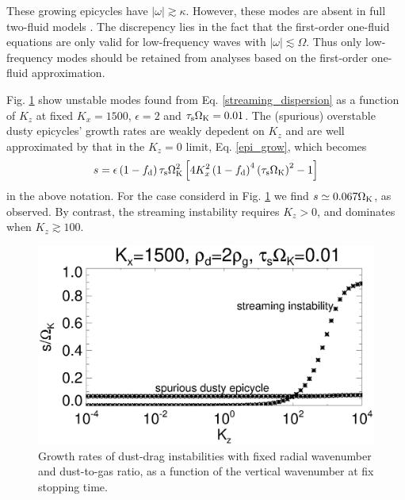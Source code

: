 These growing epicycles have $|\omega|\gtrsim \kappa$. 
However, these modes are absent in full two-fluid
models \citep{youdin05a}. The discrepency lies in the fact that the
first-order  one-fluid equations are only valid for low-frequency waves with
$|\omega|\lesssim \Omega$. Thus only 
low-frequency modes should be retained from analyses based on the
first-order one-fluid approximation. 


Fig. \ref{dusty_growth1} show unstable modes found from
Eq. \ref{streaming_dispersion} as a function of $K_z$ at fixed $K_x 
= 1500$, $\epsilon=2$ and $\tau_\mathrm{s}\Omega_{\rm K}=0.01$.  
The (spurious) overstable dusty epicycles' growth
rates are weakly depedent on $K_z$ and are well approximated by
that in the $K_z=0$ limit, Eq. \ref{epi_grow}, which becomes 
\begin{align*} 
  s = \epsilon \left(1 - f_\mathrm{d}
  \right)\tau_\mathrm{s}\Omega_{\rm K}^2\left[4K_x^2\left(1-f_\mathrm{d}\right)^4\left(\tau_\mathrm{s}\Omega_{\rm K}\right)^2
  -1 \right]
\end{align*}
in the above notation. 
For the case considerd in Fig. \ref{dusty_growth1} we find
$s\simeq0.067\Omega_{\rm K}$, as observed. By contrast, the streaming
instability requires $K_z>0$, and dominates when
$K_z\gtrsim 100$. 

\begin{figure}
  \includegraphics[width=\linewidth]{figures/streaming2}
  \caption{Growth rates of dust-drag instabilities with fixed radial
    wavenumber and dust-to-gas ratio, as a function of
    the vertical wavenumber at fix stopping time. \label{dusty_growth1}
  }
\end{figure}

